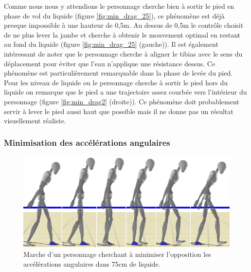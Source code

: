 \documentclass[runningheads,a4paper]{llncs}
\begin{document}
Comme nous nous y attendions le personnage cherche bien à sortir le pied en phase de vol du liquide (figure \ref{fig:min_drag_25}), ce phénomène est déjà presque impossible à une hauteur de 0,5m. Au dessus de 0,5m le contrôle choisit de ne plus lever la jambe et cherche à obtenir le mouvement optimal en restant au fond du liquide (figure \ref{fig:min_drag_25} (gauche)). Il est également intéressant de noter que le personnage cherche à aligner le tibias avec le sens du déplacement pour éviter que l'eau n'applique une résistance dessus. Ce phénomène est particulièrement remarquable dans la phase de levée du pied. Pour les niveau de liquide ou le personnage cherche à sortir le pied hors du liquide on remarque que le pied a une trajectoire assez courbée vers l'intérieur du personnage (figure \ref{fig:min_drag2} (droite)). Ce phénomène doit probablement servir à lever le pied aussi haut que possible mais il ne donne pas un résultat visuellement réaliste.  

\subsubsection{Minimisation des accélérations angulaires}
\begin{figure}[h]
\centering
\includegraphics[scale=0.4]{strips/min_acc_75cm.png}
\caption{Marche d'un personnage cherchant à minimiser l'opposition les accélérations angulaires dans 75cm de liquide.}
\label{fig:min_acc}
\end{figure}
\end{document}
